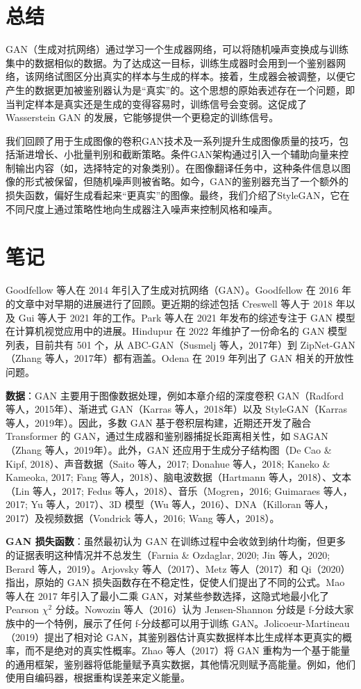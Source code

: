 \section{总结}
GAN（生成对抗网络）通过学习一个生成器网络，可以将随机噪声变换成与训练集中的数据相似的数据。为了达成这一目标，训练生成器时会用到一个鉴别器网络，该网络试图区分出真实的样本与生成的样本。接着，生成器会被调整，以便它产生的数据更加被鉴别器认为是“真实”的。这个思想的原始表述存在一个问题，即当判定样本是真实还是生成的变得容易时，训练信号会变弱。这促成了 Wasserstein GAN 的发展，它能够提供一个更稳定的训练信号。

我们回顾了用于生成图像的卷积GAN技术及一系列提升生成图像质量的技巧，包括渐进增长、小批量判别和截断策略。条件GAN架构通过引入一个辅助向量来控制输出内容（如，选择特定的对象类别）。在图像翻译任务中，这种条件信息以图像的形式被保留，但随机噪声则被省略。如今，GAN的鉴别器充当了一个额外的损失函数，偏好生成看起来“更真实”的图像。最终，我们介绍了StyleGAN，它在不同尺度上通过策略性地向生成器注入噪声来控制风格和噪声。

\section{笔记}
Goodfellow 等人在 2014 年引入了生成对抗网络（GAN）。Goodfellow 在 2016 年的文章中对早期的进展进行了回顾。更近期的综述包括 Creswell 等人于 2018 年以及 Gui 等人于 2021 年的工作。Park 等人在 2021 年发布的综述专注于 GAN 模型在计算机视觉应用中的进展。Hindupur 在 2022 年维护了一份命名的 GAN 模型列表，目前共有 501 个，从 ABC-GAN（Susmelj 等人，2017年）到 ZipNet-GAN（Zhang 等人，2017年）都有涵盖。Odena 在 2019 年列出了 GAN 相关的开放性问题。

\textbf{数据}：GAN 主要用于图像数据处理，例如本章介绍的深度卷积 GAN（Radford 等人，2015年）、渐进式 GAN（Karras 等人，2018年）以及 StyleGAN（Karras 等人，2019年）。因此，多数 GAN 基于卷积层构建，近期还开发了融合 Transformer 的 GAN，通过生成器和鉴别器捕捉长距离相关性，如 SAGAN（Zhang 等人，2019年）。此外，GAN 还应用于生成分子结构图（De Cao \& Kipf, 2018）、声音数据（Saito 等人，2017; Donahue 等人，2018; Kaneko \& Kameoka, 2017; Fang 等人，2018）、脑电波数据（Hartmann 等人，2018）、文本（Lin 等人，2017; Fedus 等人，2018）、音乐（Mogren，2016; Guimaraes 等人，2017; Yu 等人，2017）、3D 模型（Wu 等人，2016）、DNA（Killoran 等人，2017）及视频数据（Vondrick 等人，2016; Wang 等人，2018）。

\textbf{GAN 损失函数}：虽然最初认为 GAN 在训练过程中会收敛到纳什均衡，但更多的证据表明这种情况并不总发生（Farnia \& Ozdaglar, 2020; Jin 等人，2020; Berard 等人，2019）。Arjovsky 等人（2017）、Metz 等人（2017）和 Qi（2020）指出，原始的 GAN 损失函数存在不稳定性，促使人们提出了不同的公式。Mao 等人在 2017 年引入了最小二乘 GAN，对某些参数选择，这隐式地最小化了 Pearson \(\chi^2\) 分歧。Nowozin 等人（2016）认为 Jensen-Shannon 分歧是 f-分歧大家族中的一个特例，展示了任何 f-分歧都可以用于训练 GAN。Jolicoeur-Martineau（2019）提出了相对论 GAN，其鉴别器估计真实数据样本比生成样本更真实的概率，而不是绝对的真实性概率。Zhao 等人（2017）将 GAN 重构为一个基于能量的通用框架，鉴别器将低能量赋予真实数据，其他情况则赋予高能量。例如，他们使用自编码器，根据重构误差来定义能量。

